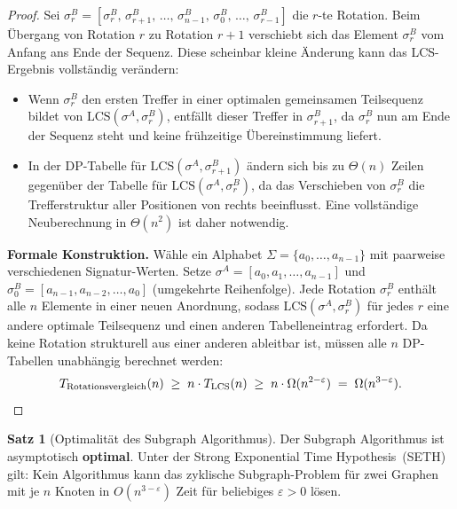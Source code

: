 ﻿\documentclass[a4paper,12pt]{article}
\theoremstyle{definition}
\newtheorem{satz}{Satz}
\begin{document}
\begin{proof}
Sei $\sigma^B_r = [\sigma_r^B,\, \sigma_{r+1}^B,\, \ldots,\, \sigma_{n-1}^B,\, \sigma_0^B,\, \ldots,\, \sigma_{r-1}^B]$ die $r$-te Rotation.
Beim Übergang von Rotation $r$ zu Rotation $r+1$ verschiebt sich das Element $\sigma_r^B$ vom Anfang ans Ende der Sequenz.
Diese scheinbar kleine Änderung kann das LCS-Ergebnis vollständig verändern:

\begin{itemize}
	\item Wenn $\sigma_r^B$ den ersten Treffer in einer optimalen gemeinsamen Teilsequenz bildet von $\mathrm{LCS}(\sigma^A, \sigma^B_r)$, entfällt dieser Treffer in $\sigma^B_{r+1}$,
	      da $\sigma_r^B$ nun am Ende der Sequenz steht und keine frühzeitige Übereinstimmung liefert.
	\item In der DP-Tabelle für $\mathrm{LCS}(\sigma^A, \sigma^B_{r+1})$ ändern sich bis zu $\Theta(n)$
	      Zeilen gegenüber der Tabelle für $\mathrm{LCS}(\sigma^A, \sigma^B_r)$, da das Verschieben von
	      $\sigma_r^B$ die Trefferstruktur aller Positionen von rechts beeinflusst.
	      Eine vollständige Neuberechnung in $\Theta(n^2)$ ist daher notwendig.
\end{itemize}

\textbf{Formale Konstruktion.}
Wähle ein Alphabet $\Sigma = \{a_0, \ldots, a_{n-1}\}$ mit paarweise verschiedenen Signatur-Werten.
Setze $\sigma^A = [a_0, a_1, \ldots, a_{n-1}]$ und $\sigma^B_0 = [a_{n-1}, a_{n-2}, \ldots, a_0]$
(umgekehrte Reihenfolge).
Jede Rotation $\sigma^B_r$ enthält alle $n$ Elemente in einer neuen Anordnung, sodass
$\mathrm{LCS}(\sigma^A, \sigma^B_r)$ für jedes $r$ eine andere optimale Teilsequenz und einen anderen Tabelleneintrag erfordert.
Da keine Rotation strukturell aus einer anderen ableitbar ist, müssen alle $n$ DP-Tabellen unabhängig berechnet werden:
\[
	T_{\text{Rotationsvergleich}}(n) \;\geq\; n \cdot T_{\mathrm{LCS}}(n) \;\geq\; n \cdot \Omega(n^{2-\varepsilon}) \;=\; \Omega(n^{3-\varepsilon}). \qedhere
\]
\end{proof}

\begin{satz}[Optimalität des Subgraph Algorithmus]
\label{satz:optimalitaet}
Der Subgraph Algorithmus ist asymptotisch \textbf{optimal}.
Unter der Strong Exponential Time Hypothesis~(SETH) gilt: Kein Algorithmus kann das zyklische Subgraph-Problem für zwei Graphen mit je $n$ Knoten in $O(n^{3-\varepsilon})$ Zeit für beliebiges $\varepsilon > 0$ lösen.
\end{satz}
\end{document}
